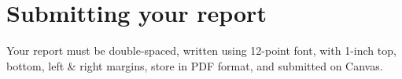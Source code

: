 \documentclass{article}
\begin{document}
\section*{Submitting your report}

Your report must be double-spaced, written using 12-point font, with 1-inch top, bottom, left \& right margins,
store in PDF format, and submitted on Canvas.
\end{document}
